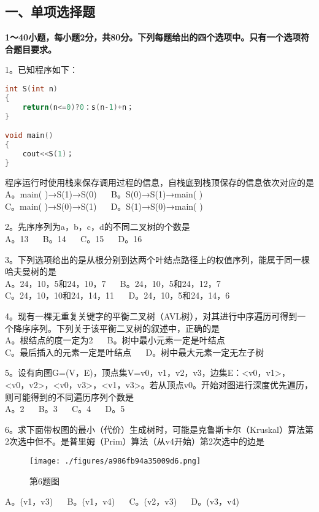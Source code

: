
\subsection{一、单项选择题}
\textbf{1～40小题，每小题2分，共80分。下列每题给出的四个选项中。只有一个选项符合题目要求。}

1。已知程序如下： \\
\begin{lstlisting}[language=cpp]
int S(int n)
{
    return(n<=0)?0：s(n-1)+n；
}

void main()
{ 
    cout<<S(1)；
}
\end{lstlisting}
程序运行时使用栈来保存调用过程的信息，自栈底到栈顶保存的信息依次对应的是 \\
A。main( )→S(1)→S(0) $\quad$ B。S(0)→S(1)→main( ) \\
C。main( )→S(0)→S(1) $\quad$ D。S(1)→S(0)→main( )

2。先序序列为a，b，c，d的不同二叉树的个数是 \\
A。13 $\quad$ B。14 $\quad$ C。15 $\quad$ D。16

3。下列选项给出的是从根分别到达两个叶结点路径上的权值序列，能属于同一棵哈夫曼树的是 \\
A。24，10，5和24，10，7 $\quad$ B。24，10，5和24，12，7 \\
C。24，10，10和24，14，11 $\quad$ D。24，10，5和24，14，6

4。现有一棵无重复关键字的平衡二叉树（AVL树），对其进行中序遍历可得到一个降序序列。下列关于该平衡二叉树的叙述中，正确的是 \\
A。根结点的度一定为2 $\quad$ B。树中最小元素一定是叶结点 \\
C。最后插入的元素一定是叶结点 $\quad$ D。树中最大元素一定无左子树

5。设有向图G=(V，E)，顶点集V={v0，v1，v2，v3}，边集E：{<v0，v1>，<v0，v2>，<v0，v3>，<v1，v3>}。若从顶点v0。开始对图进行深度优先遍历，则可能得到的不同遍历序列个数是 \\
A。2 $\quad$ B。3 $\quad$ C。4 $\quad$ D。5

6。求下面带权图的最小（代价）生成树时，可能是克鲁斯卡尔（Kruskal）算法第2次选中但不。是普里姆（Prim）算法（从v4开始）第2次选中的边是
\begin{figure}[ht]
\centering
\texttt{[image: ./figures/a986fb94a35009d6.png]}
\caption{第6题图} \label{fig_CSN15_1}
\end{figure}
A。(v1，v3) $\quad$ B。(v1，v4) $\quad$ C。(v2，v3) $\quad$ D。(v3，v4)


